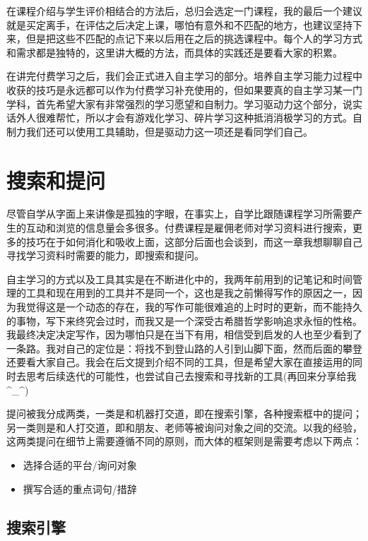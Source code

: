 \documentclass[
]{book}
\begin{document}
在课程介绍与学生评价相结合的方法后，总归会选定一门课程，我的最后一个建议就是买定离手，在评估之后决定上课，哪怕有意外和不匹配的地方，也建议坚持下来，但是把这些不匹配的点记下来以后用在之后的挑选课程中。每个人的学习方式和需求都是独特的，这里讲大概的方法，而具体的实践还是要看大家的积累。

在讲完付费学习之后，我们会正式进入自主学习的部分。培养自主学习能力过程中收获的技巧是永远都可以作为付费学习补充使用的，但如果要真的自主学习某一门学科，首先希望大家有非常强烈的学习愿望和自制力。学习驱动力这个部分，说实话外人很难帮忙，所以才会有游戏化学习、碎片学习这种抵消消极学习的方式。自制力我们还可以使用工具辅助，但是驱动力这一项还是看同学们自己。

\hypertarget{ux641cux7d22ux548cux63d0ux95ee}{%
\chapter{搜索和提问}\label{ux641cux7d22ux548cux63d0ux95ee}}

尽管自学从字面上来讲像是孤独的字眼，在事实上，自学比跟随课程学习所需要产生的互动和浏览的信息量会多很多。付费课程是雇佣老师对学习资料进行搜索，更多的技巧在于如何消化和吸收上面，这部分后面也会谈到，而这一章我想聊聊自己寻找学习资料时需要的能力，即搜索和提问。

自主学习的方式以及工具其实是在不断进化中的，我两年前用到的记笔记和时间管理的工具和现在用到的工具并不是同一个，这也是我之前懒得写作的原因之一，因为我觉得这是一个动态的存在，我的写作可能很难追的上时时的更新，而不能持久的事物，写下来终究会过时，而我又是一个深受古希腊哲学影响追求永恒的性格。我最终决定决定写作，因为哪怕只是在当下有用，相信受到启发的人也至少看到了一条路。我对自己的定位是：将找不到登山路的人引到山脚下面，然而后面的攀登还要看大家自己。我会在后文提到介绍不同的工具，但是希望大家在直接运用的同时去思考后续迭代的可能性，也尝试自己去搜索和寻找新的工具(再回来分享给我 \^{}\_\^{})

提问被我分成两类，一类是和机器打交道，即在搜索引擎，各种搜索框中的提问；另一类则是和人打交道，即和朋友、老师等被询问对象之间的交流。以我的经验，这两类提问在细节上需要遵循不同的原则，而大体的框架则是需要考虑以下两点：

\begin{itemize}
\item
  选择合适的平台/询问对象
\item
  撰写合适的重点词句/措辞
\end{itemize}

\hypertarget{ux641cux7d22ux5f15ux64ce}{%
\section{搜索引擎}\label{ux641cux7d22ux5f15ux64ce}}
\end{document}

